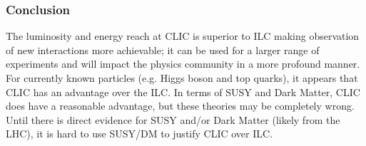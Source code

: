 	
\subsubsection{Conclusion}
The luminosity and energy reach at CLIC is superior to ILC making observation of new interactions more achievable; it can be used for a larger range of experiments and will impact the physics community in a more profound manner. For currently known particles (e.g. Higgs boson and top quarks), it appears that CLIC has an advantage over the ILC. In terms of SUSY and Dark Matter, CLIC does have a reasonable advantage, but these theories may be completely wrong. Until there is direct evidence for SUSY and/or Dark Matter (likely from the LHC), it is hard to use SUSY/DM to justify CLIC over ILC.